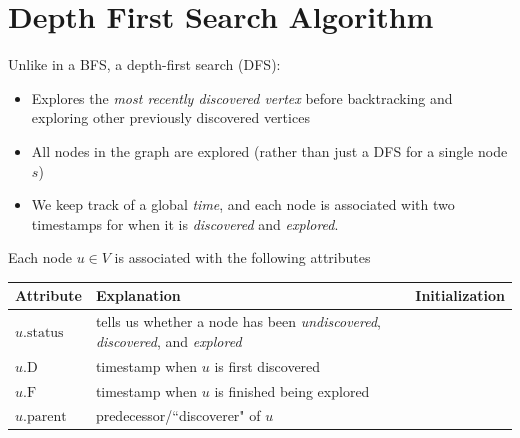 \documentclass[11  pt]{exam}
\begin{document}
	\newpage 
	
	\section{Depth First Search Algorithm}
	Unlike in a BFS, a depth-first search (DFS):
	\begin{itemize}
		\item Explores the \emph{most recently discovered vertex} before backtracking and exploring other previously discovered vertices
		\item All nodes in the graph are explored (rather than just a DFS for a single node $s$)
		\item We keep track of a global \emph{time}, and each node is associated with two timestamps for when it is \emph{discovered} and \emph{explored}.
	\end{itemize}
	
	Each node $u \in V$ is associated with the following attributes
	
	\begin{tabular}{| l | p{8cm} | p{6cm} |}
		\hline
		Attribute & Explanation &Initialization \\
		\hline
		$u.\text{status}$ & tells us whether a node has been \emph{undiscovered}, \emph{discovered}, and \emph{explored} &  \\
		\hline
		$u.\text{D}$ & timestamp when $u$ is first discovered \phantom{the aa} \phantom{quick brown fox jumps over the lazy dog}
		\phantom{for more writing later on in the dell you know} &  \\
		\hline
		$u.\text{F}$ & timestamp when $u$ is finished being explored \phantom{the aa} \phantom{quick brown fox jumps over the lazy dog}
		\phantom{for more writing later on in the dell you know}  &  \\
		\hline
		$u.\text{parent}$ & predecessor/``discoverer" of $u$ \phantom{s a a a a a  here} \phantom{for more writing later on in the dell you know}& \\
		\hline
	\end{tabular}
	\newpage 
	
	
\end{document}
